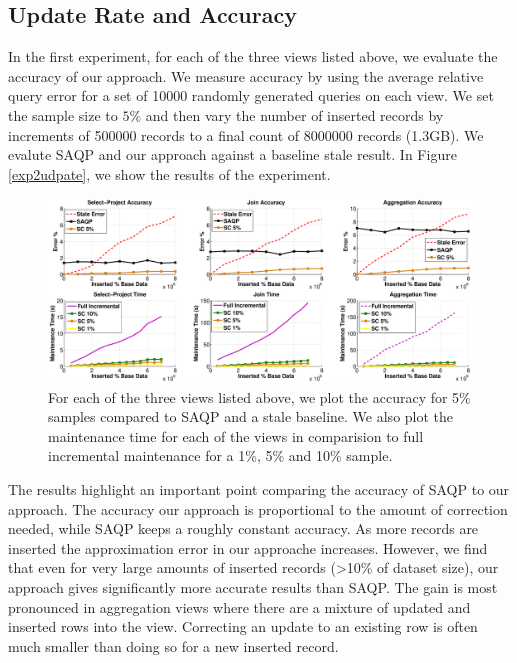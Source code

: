 \subsection{Update Rate and Accuracy}
In the first experiment, for each of the three views listed above, we evaluate the accuracy of our approach.
We measure accuracy by using the average relative query error for a set of 10000 randomly generated queries on each view.
We set the sample size to $5\%$ and then vary the number of inserted records by increments of 500000 records to a final count of 8000000 records (1.3GB).
We evalute SAQP and our approach against a baseline stale result.
In Figure \ref{exp2udpate}, we show the results of the experiment. 

\begin{figure}[ht!]
\label{exp2update}
\centering
 \includegraphics[scale=0.27]{exp/exp2-full.eps}
 \caption{For each of the three views listed above, we plot the accuracy for 5\% samples compared to SAQP and a stale baseline. We also plot the maintenance time for each of the views in comparision to full incremental maintenance for a 1\%, 5\% and 10\% sample. }
\end{figure}

The results highlight an important point comparing the accuracy of SAQP to our approach. 
The accuracy our approach is proportional to the amount of correction needed, while SAQP keeps a roughly constant accuracy.
As more records are inserted the approximation error in our approache increases.
However, we find that even for very large amounts of inserted records (>10\% of dataset size), our approach gives significantly more accurate results
than SAQP.
The gain is most pronounced in aggregation views where there are a mixture of updated and inserted rows into the view.
Correcting an update to an existing row is often much smaller than doing so for a new inserted record.


